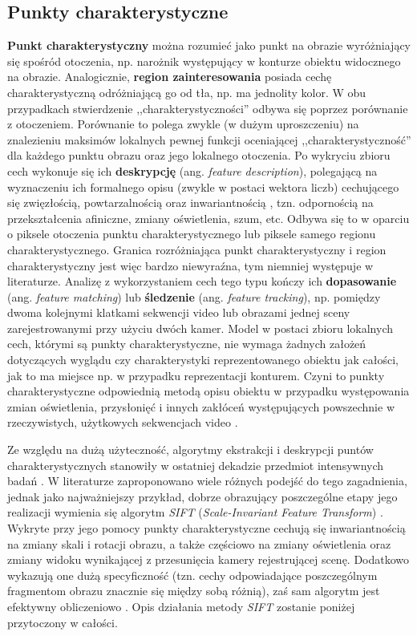 \subsection{Punkty charakterystyczne}
\label{subsec:Punkty_charakterystyczne}
\textbf{Punkt charakterystyczny} można rozumieć jako punkt na obrazie wyróżniający się spośród otoczenia, np. narożnik występujący w konturze obiektu widocznego na obrazie. Analogicznie, \textbf{region zainteresowania} posiada cechę charakterystyczną odróżniającą go od tła, np. ma jednolity kolor. W obu przypadkach stwierdzenie ,,charakterystyczności'' odbywa się poprzez porównanie z otoczeniem. Porównanie to polega zwykle (w dużym uproszczeniu) na znalezieniu maksimów lokalnych pewnej funkcji oceniającej ,,charakterystyczność'' dla każdego punktu obrazu oraz jego lokalnego otoczenia. Po wykryciu zbioru cech wykonuje się ich \textbf{deskrypcję} (ang. \textit{feature description}), polegającą na wyznaczeniu ich formalnego opisu (zwykle w postaci wektora liczb) cechującego się zwięzłością, powtarzalnością oraz inwariantnością \cite{Szeliski2011}, tzn. odpornością na przekształcenia afiniczne, zmiany oświetlenia, szum, etc. Odbywa się to w oparciu o piksele otoczenia punktu charakterystycznego lub piksele samego regionu charakterystycznego. Granica rozróżniająca punkt charakterystyczny i region charakterystyczny jest więc bardzo niewyraźna, tym niemniej występuje w literaturze. Analizę z wykorzystaniem cech tego typu kończy ich \textbf{dopasowanie} (ang. \textit{feature matching}) lub \textbf{śledzenie} (ang. \textit{feature tracking}), np. pomiędzy dwoma kolejnymi klatkami sekwencji video lub obrazami jednej sceny zarejestrowanymi przy użyciu dwóch kamer. Model w postaci zbioru lokalnych cech, którymi są punkty charakterystyczne, nie wymaga żadnych założeń dotyczących wyglądu czy charakterystyki reprezentowanego obiektu jak całości, jak to ma miejsce np. w przypadku reprezentacji konturem. Czyni to punkty charakterystyczne odpowiednią metodą opisu obiektu w przypadku występowania zmian oświetlenia, przysłonięć i innych zakłóceń występujących powszechnie w rzeczywistych, użytkowych sekwencjach video \cite{Treiber2010}.

Ze względu na dużą użyteczność, algorytmy ekstrakcji i deskrypcji puntów charakterystycznych stanowiły w ostatniej dekadzie przedmiot intensywnych badań \cite{Treiber2010}. W literaturze zaproponowano wiele różnych podejść do tego zagadnienia, jednak jako najważniejszy przykład, dobrze obrazujący poszczególne etapy jego realizacji wymienia się algorytm \textit{SIFT} (\textit{Scale-Invariant Feature Transform}) \cite{Treiber2010} \cite{Szeliski2011}. Wykryte przy jego pomocy punkty charakterystyczne cechują się inwariantnością na zmiany skali i rotacji obrazu, a także częściowo na zmiany oświetlenia oraz zmiany widoku wynikającej z przesunięcia kamery rejestrującej scenę. Dodatkowo wykazują one dużą specyficzność (tzn. cechy odpowiadające poszczególnym fragmentom obrazu znacznie się między sobą różnią), zaś sam algorytm jest efektywny obliczeniowo \cite{Lowe2004}. Opis działania metody \textit{SIFT} zostanie poniżej przytoczony w całości.

